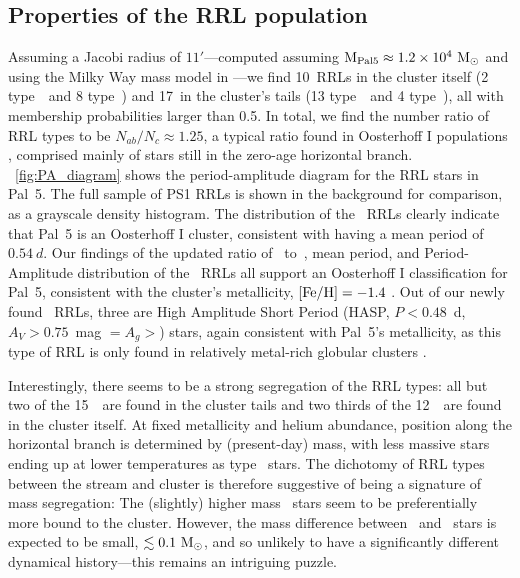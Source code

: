 \documentclass[twocolumn]{aastex63}
\newcommand{\NRRab}{15}    %
\newcommand{\NRRc}{12}     %
\newcommand{\NRRcl}{10}     %
\newcommand{\NRRtails}{17} %
\begin{document}
\subsection{Properties of the RRL population}

Assuming a Jacobi radius of $11'$---computed assuming $\textrm{M}_{\rm Pal 5} \approx 1.2\times10^4~\mathrm{M}_\odot$ \citep{Kuepper:2015} and using the Milky Way mass model in \citet{gala}---we find \NRRcl\ RRLs in the cluster itself (2 type~\typeab\ and 8 type~\typec) and \NRRtails\ in the cluster's tails (13 type~\typeab\ and 4 type~\typec), all with membership probabilities larger than 0.5. In total, we find the number ratio of RRL types to be $N_{ab} / N_{c} \approx 1.25$, a typical ratio found in Oosterhoff I populations \citep{Smith:1995},  comprised mainly of stars still in the zero-age horizontal branch. \figurename~\ref{fig:PA_diagram} shows the period-amplitude diagram for the RRL stars in Pal~5. The full sample of PS1 RRLs is shown in the background for comparison, as a grayscale density histogram. The distribution of the \typeab~RRLs clearly indicate that Pal~5 is an Oosterhoff I cluster, consistent with having a mean period of $0.54~d$. Our findings of the updated ratio of \rrab~to~\rrc, mean period, and Period-Amplitude distribution of the \rrab\ RRLs all support an Oosterhoff I classification for Pal~5, consistent with the cluster's metallicity, $[\mathrm{Fe}/\mathrm{H}]=-1.4$ \citep{Dotter:2011}. 
Out of our newly found \rrab\ RRLs, three are High Amplitude Short Period (HASP, $P <0.48$~d, $A_V>0.75$~mag $=A_g>$) stars, again consistent with Pal~5's metallicity,  as this type of RRL is only found in relatively metal-rich globular clusters  \citep[$\FeH>-1.5$;][]{Monelli:2017}.

Interestingly, there seems to be a strong segregation of the RRL types: all but two of the \NRRab\ \rrab~are found in the cluster tails and two thirds of the \NRRc\ \rrc~are found in the cluster itself. At fixed metallicity and helium abundance, position along the horizontal branch is determined by (present-day) mass, with less massive stars ending up at lower temperatures as type \typeab~stars. 
The dichotomy of RRL types between the stream and cluster is therefore suggestive of being a signature of mass segregation: The (slightly) higher mass \rrc\ stars seem to be preferentially more bound to the cluster.
However, the mass difference between \rrab\ and \rrc\ stars is expected to be small, $\lesssim 0.1~\mathrm{M}_\odot$, and so unlikely to have a significantly different dynamical history---this remains an intriguing puzzle.
\end{document}
